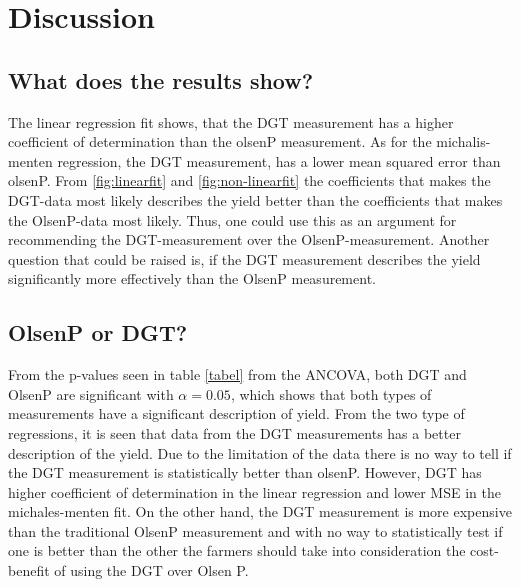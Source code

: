 \documentclass[11pt, fleqn, titlepage]{article}
\begin{document}
\section{Discussion}

\subsection*{What does the results show?}
The linear regression fit shows, that the DGT measurement has a higher coefficient of determination than the olsenP measurement. As for the michalis-menten regression, the DGT measurement, has a lower mean squared error than olsenP. From \ref{fig:linearfit} and \ref{fig:non-linearfit} the coefficients that makes the DGT-data most likely describes the yield better than the coefficients that makes the OlsenP-data most likely. Thus, one could use this as an argument for recommending the DGT-measurement over the OlsenP-measurement. Another question that could be raised is, if the DGT measurement describes the yield significantly more effectively than the OlsenP measurement.

\subsection*{OlsenP or DGT?} 
From the p-values seen in table \ref{tabel} from the ANCOVA, both DGT and OlsenP are significant with $ \alpha = 0.05 $, which shows that both types of measurements have a significant description of yield. From the two type of regressions, it is seen that data from the DGT measurements has a better description of the yield. Due to the limitation of the data there is no way to tell if the DGT measurement is statistically better than olsenP. However, DGT has higher coefficient of determination in the linear regression and lower MSE in the michales-menten fit. On the other hand, the DGT measurement is more expensive than the traditional OlsenP measurement and with no way to statistically test if one is better than the other the farmers should take into consideration the cost-benefit of using the DGT over Olsen P. 
\end{document}
